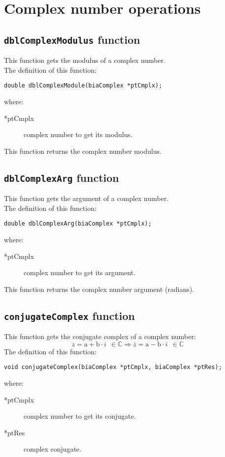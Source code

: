 \section{Complex number operations}

\subsection{\texttt{dblComplexModulus} function}

This function gets the modulus of a complex number.\\

The definition of this function:
%
\begin{verbatim}
double dblComplexModule(biaComplex *ptCmplx);  
\end{verbatim}
%
where:
%
\begin{description}
\item[*ptCmplx] complex number to get its modulus.
\end{description}
%
This function returns the complex number modulus.

\subsection{\texttt{dblComplexArg} function}

This function gets the argument of a complex number.\\

The definition of this function:
%
\begin{verbatim}
double dblComplexArg(biaComplex *ptCmplx);  
\end{verbatim}
%
where:
%
\begin{description}
\item[*ptCmplx] complex number to get its argument.
\end{description}
%
This function returns the complex number argument (radians).

\subsection{\texttt{conjugateComplex} function}

This function gets the conjugate complex of a complex number:
%
\begin{displaymath}
z = \textrm{a} + \textrm{b} \cdot i \ \ \in \mathbb{C} \Rightarrow \overline{z} = \textrm{a} - \textrm{b} \cdot i \ \ \in \mathbb{C}
\end{displaymath}
%
The definition of this function:
%
\begin{verbatim}
void conjugateComplex(biaComplex *ptCmplx, biaComplex *ptRes);  
\end{verbatim}
%
where:
%
\begin{description}
\item[*ptCmplx] complex number to get its conjugate.
\item[*ptRes] complex conjugate.
\end{description}

